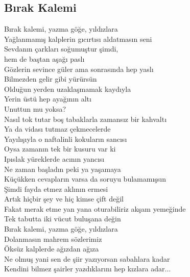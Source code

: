 \subsection{Bırak Kalemi}

Bırak kalemi, yazma göğe, yıldızlara \\
Yağlanmamış kalplerin gıcırtısı aldatmasın seni \\
Sevdanın çarkları soğumuştur şimdi, \\
hem de baştan aşağı paslı \\
Gözlerin sevince güler ama sonrasında hep yaslı \\

\noindent\newline
Bilmezden gelir gibi yürürsün \\
Olduğun yerden uzaklaşmamak kaydıyla \\
Yerin üstü hep ayağının altı \\
Unuttun mu yoksa? \\
Nasıl tok tutar boş tabaklarla zamansız bir kahvaltı \\
Ya da vidası tutmaz çekmecelerde \\
Yayılışıyla o naftalinli kokuların sancısı \\
Oysa zamanın tek bir kusuru var ki \\
Ipıslak yüreklerde acının yancısı \\

\noindent\newline
Ne zaman başladın peki ya yaşamaya \\
Küçükken cevapların varsa da soruyu bulamamışsın \\
Şimdi fayda etmez aklının ermesi \\
Artık hiçbir şey ve hiç kimse çift değil \\
Fakat merak etme yan yana oturabiliriz akşam yemeğinde \\
Tek tabutta iki vücut buluşana değin \\

\noindent\newline
Bırak kalemi, yazma göğe, yıldızlara \\
Dolanmasın mahrem sözlerimiz \\
Öksüz kalplerde ağızdan ağıza \\
Ne olmuş yani sen de şiir yazıyorsan sabahlara kadar \\
Kendini bilmez şairler yazdıklarını hep kızlara adar... \\